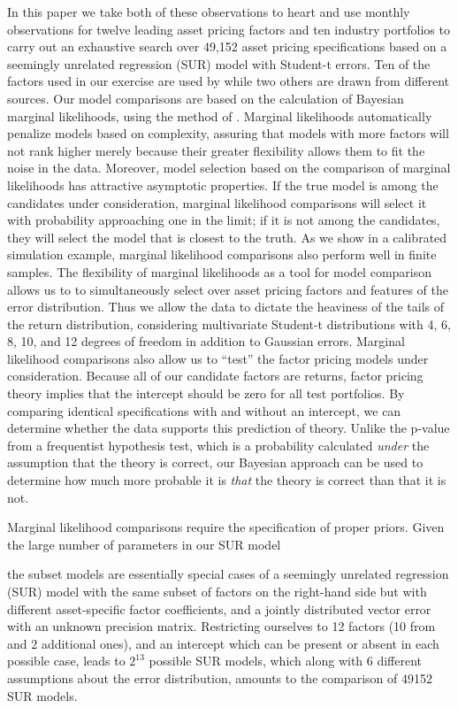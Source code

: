 In this paper we take both of these observations to heart and use monthly observations for twelve leading asset pricing factors and ten industry portfolios to carry out an exhaustive search over 49,152 asset pricing specifications based on a seemingly unrelated regression (SUR) model with Student-t errors.
Ten of the factors used in our exercise are used by \cite{harvey2015lucky} while two others are drawn from different sources.
Our model comparisons are based on the calculation of Bayesian marginal likelihoods, using the method of \cite{chib1995marginal}.
Marginal likelihoods automatically penalize models based on complexity, assuring that models with more factors will not rank higher merely because their greater flexibility allows them to fit the noise in the data. 
Moreover, model selection based on the comparison of marginal likelihoods has attractive asymptotic properties.
If the true model is among the candidates under consideration, marginal likelihood comparisons will select it with probability approaching one in the limit; if it is not among the candidates, they will select the model that is closest to the truth.
As we show in a calibrated simulation example, marginal likelihood comparisons also perform well in finite samples.
The flexibility of marginal likelihoods as a tool for model comparison allows us to to simultaneously select over asset pricing factors and features of the error distribution.
Thus we allow the data to dictate the heaviness of the tails of the return distribution, considering multivariate Student-t distributions with 4, 6, 8, 10, and 12 degrees of freedom in addition to Gaussian errors. 
Marginal likelihood comparisons also allow us to ``test'' the factor pricing models under consideration.
Because all of our candidate factors are returns, factor pricing theory implies that the intercept should be zero for all test portfolios. 
By comparing identical specifications with and without an intercept, we can determine whether the data supports this prediction of theory.
Unlike the p-value from a frequentist hypothesis test, which is a probability calculated \emph{under} the assumption that the theory is correct, our Bayesian approach can be used to determine how much more probable it is \emph{that} the theory is correct than that it is not.

Marginal likelihood comparisons require the specification of proper priors.
Given the large number of parameters in our SUR model

the subset models are essentially special cases of a seemingly unrelated regression (SUR) model with the same subset of factors on the right-hand side but with different asset-specific factor coefficients, and a jointly distributed vector error with an unknown precision matrix. Restricting ourselves to 12 factors (10 from \cite{harvey2015lucky} and 2 additional ones), 
  and an intercept which can be present or absent in each possible case, leads to $2^{13}$ possible SUR models, which along with 6 different assumptions about the error distribution, amounts to the comparison of 49152 SUR models.
  
